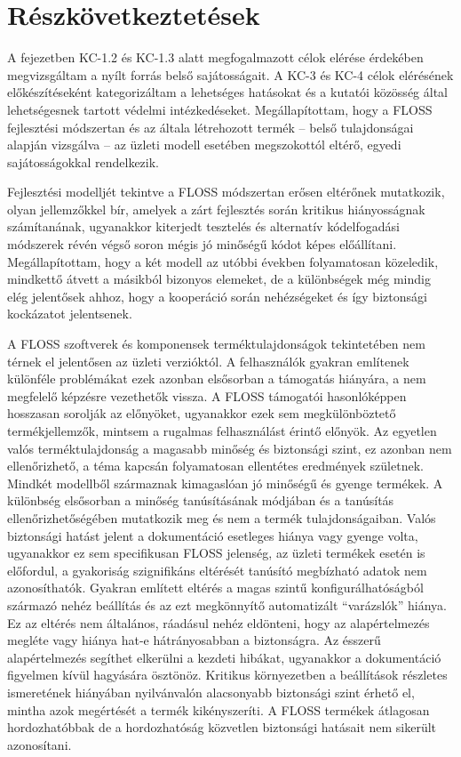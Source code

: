 \documentclass[12pt,magyar,a4paper,oneside]{scrreprt}
\begin{document}
\hypertarget{ruxe9szkuxf6vetkeztetuxe9sek-1}{%
\section{Részkövetkeztetések}\label{ruxe9szkuxf6vetkeztetuxe9sek-1}}

A fejezetben KC-1.2 és KC-1.3 alatt megfogalmazott célok elérése
érdekében megvizsgáltam a nyílt forrás belső sajátosságait. A KC-3 és
KC-4 célok elérésének előkészítéseként kategorizáltam a lehetséges
hatásokat és a kutatói közösség által lehetségesnek tartott védelmi
intézkedéseket. Megállapítottam, hogy a FLOSS fejlesztési módszertan és
az általa létrehozott termék -- belső tulajdonságai alapján vizsgálva --
az üzleti modell esetében megszokottól eltérő, egyedi sajátosságokkal
rendelkezik.

Fejlesztési modelljét tekintve a FLOSS módszertan erősen eltérőnek
mutatkozik, olyan jellemzőkkel bír, amelyek a zárt fejlesztés során
kritikus hiányosságnak számítanának, ugyanakkor kiterjedt tesztelés és
alternatív kódelfogadási módszerek révén végső soron mégis jó minőségű
kódot képes előállítani. Megállapítottam, hogy a két modell az utóbbi
években folyamatosan közeledik, mindkettő átvett a másikból bizonyos
elemeket, de a különbségek még mindig elég jelentősek ahhoz, hogy a
kooperáció során nehézségeket és így biztonsági kockázatot jelentsenek.

A FLOSS szoftverek és komponensek terméktulajdonságok tekintetében nem
térnek el jelentősen az üzleti verzióktól. A felhasználók gyakran
említenek különféle problémákat ezek azonban elsősorban a támogatás
hiányára, a nem megfelelő képzésre vezethetők vissza. A FLOSS támogatói
hasonlóképpen hosszasan sorolják az előnyöket, ugyanakkor ezek sem
megkülönböztető termékjellemzők, mintsem a rugalmas felhasználást érintő
előnyök. Az egyetlen valós terméktulajdonság a magasabb minőség és
biztonsági szint, ez azonban nem ellenőrizhető, a téma kapcsán
folyamatosan ellentétes eredmények születnek. Mindkét modellből
származnak kimagaslóan jó minőségű és gyenge termékek. A különbség
elsősorban a minőség tanúsításának módjában és a tanúsítás
ellenőrizhetőségében mutatkozik meg és nem a termék tulajdonságaiban.
Valós biztonsági hatást jelent a dokumentáció esetleges hiánya vagy
gyenge volta, ugyanakkor ez sem specifikusan FLOSS jelenség, az üzleti
termékek esetén is előfordul, a gyakoriság szignifikáns eltérését
tanúsító megbízható adatok nem azonosíthatók. Gyakran említett eltérés a
magas szintű konfigurálhatóságból származó nehéz beállítás és az ezt
megkönnyítő automatizált ``varázslók'' hiánya. Ez az eltérés nem
általános, ráadásul nehéz eldönteni, hogy az alapértelmezés megléte vagy
hiánya hat-e hátrányosabban a biztonságra. Az ésszerű alapértelmezés
segíthet elkerülni a kezdeti hibákat, ugyanakkor a dokumentáció
figyelmen kívül hagyására ösztönöz. Kritikus környezetben a beállítások
részletes ismeretének hiányában nyilvánvalón alacsonyabb biztonsági
szint érhető el, mintha azok megértését a termék kikényszeríti. A FLOSS
termékek átlagosan hordozhatóbbak de a hordozhatóság közvetlen
biztonsági hatásait nem sikerült azonosítani.
\end{document}
